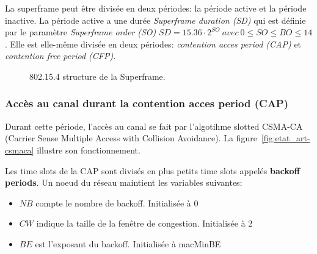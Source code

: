   La superframe peut être divisée en deux périodes: la période active et la période inactive.
  La période active a une durée \textit{Superframe duration (SD)} qui est définie par 
  le paramètre \textit{Superframe order (SO)} $SD=15.36 \cdot 2^{SO}\ avec\ 0 \leq SO \leq BO \leq 14$.
  Elle est elle-même divisée en deux périodes:
  \textit{contention acces period (CAP)} et \textit{contention free period (CFP)}.
  \begin{figure}[H]
    \centering
    \caption{802.15.4 structure de la Superframe.}
    \label{fig:etat_art-802.15.4.superframe}
  \end{figure}

\subsubsection*{Accès au canal durant la contention acces period (CAP)}
  Durant cette période, l'accès au canal se fait par l'algotihme slotted CSMA-CA
  (Carrier Sense Multiple Access with Collision Avoidance). La figure~\ref{fig:etat_art-csmaca}
  illustre son fonctionnement.

  Les time slots de la CAP sont divisés en plus petits time slots appelés \textbf{backoff periods}.
  Un noeud du réseau maintient les variables suivantes:
  \begin{itemize}[label=\textbullet]
    \item $NB$ compte le nombre de backoff. Initialisée à 0
    \item $CW$ indique la taille de la fenêtre de congestion. Initialisée à 2
    \item $BE$ est l'exposant du backoff. Initialisée à macMinBE
  \end{itemize}

